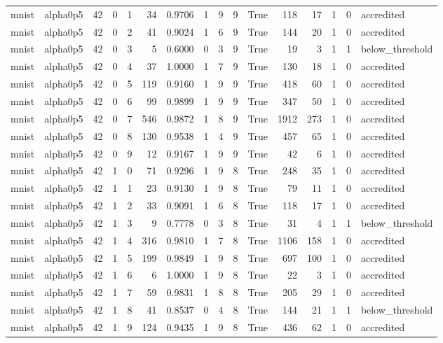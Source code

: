 \begin{tabular}{llrrrrrrrrrrrrrl}
mnist & alpha0p5 & 42 & 0 & 1 & 34 & 0.9706 & 1 & 9 & 9 & True & 118 & 17 & 1 & 0 & accredited \\
mnist & alpha0p5 & 42 & 0 & 2 & 41 & 0.9024 & 1 & 6 & 9 & True & 144 & 20 & 1 & 0 & accredited \\
mnist & alpha0p5 & 42 & 0 & 3 & 5 & 0.6000 & 0 & 3 & 9 & True & 19 & 3 & 1 & 1 & below\_threshold \\
mnist & alpha0p5 & 42 & 0 & 4 & 37 & 1.0000 & 1 & 7 & 9 & True & 130 & 18 & 1 & 0 & accredited \\
mnist & alpha0p5 & 42 & 0 & 5 & 119 & 0.9160 & 1 & 9 & 9 & True & 418 & 60 & 1 & 0 & accredited \\
mnist & alpha0p5 & 42 & 0 & 6 & 99 & 0.9899 & 1 & 9 & 9 & True & 347 & 50 & 1 & 0 & accredited \\
mnist & alpha0p5 & 42 & 0 & 7 & 546 & 0.9872 & 1 & 8 & 9 & True & 1912 & 273 & 1 & 0 & accredited \\
mnist & alpha0p5 & 42 & 0 & 8 & 130 & 0.9538 & 1 & 4 & 9 & True & 457 & 65 & 1 & 0 & accredited \\
mnist & alpha0p5 & 42 & 0 & 9 & 12 & 0.9167 & 1 & 9 & 9 & True & 42 & 6 & 1 & 0 & accredited \\
mnist & alpha0p5 & 42 & 1 & 0 & 71 & 0.9296 & 1 & 9 & 8 & True & 248 & 35 & 1 & 0 & accredited \\
mnist & alpha0p5 & 42 & 1 & 1 & 23 & 0.9130 & 1 & 9 & 8 & True & 79 & 11 & 1 & 0 & accredited \\
mnist & alpha0p5 & 42 & 1 & 2 & 33 & 0.9091 & 1 & 6 & 8 & True & 118 & 17 & 1 & 0 & accredited \\
mnist & alpha0p5 & 42 & 1 & 3 & 9 & 0.7778 & 0 & 3 & 8 & True & 31 & 4 & 1 & 1 & below\_threshold \\
mnist & alpha0p5 & 42 & 1 & 4 & 316 & 0.9810 & 1 & 7 & 8 & True & 1106 & 158 & 1 & 0 & accredited \\
mnist & alpha0p5 & 42 & 1 & 5 & 199 & 0.9849 & 1 & 9 & 8 & True & 697 & 100 & 1 & 0 & accredited \\
mnist & alpha0p5 & 42 & 1 & 6 & 6 & 1.0000 & 1 & 9 & 8 & True & 22 & 3 & 1 & 0 & accredited \\
mnist & alpha0p5 & 42 & 1 & 7 & 59 & 0.9831 & 1 & 8 & 8 & True & 205 & 29 & 1 & 0 & accredited \\
mnist & alpha0p5 & 42 & 1 & 8 & 41 & 0.8537 & 0 & 4 & 8 & True & 144 & 21 & 1 & 1 & below\_threshold \\
mnist & alpha0p5 & 42 & 1 & 9 & 124 & 0.9435 & 1 & 9 & 8 & True & 436 & 62 & 1 & 0 & accredited \\

\end{tabular}

